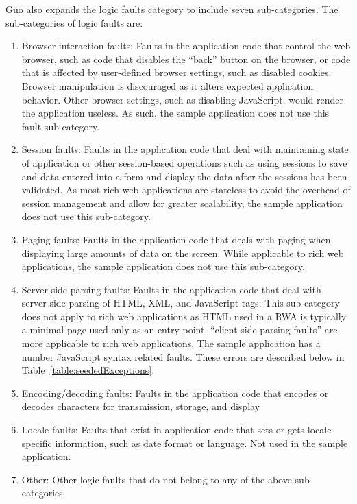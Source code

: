 Guo also expands the logic faults category to include seven sub-categories.  The sub-categories of logic faults are:

\begin{enumerate}
\item Browser interaction faults: Faults in the application code that control the web browser, such as code that disables the ``back'' button on the browser, or code that is affected by user-defined browser settings, such as disabled cookies.  Browser manipulation is discouraged as it alters expected application behavior.  Other browser settings, such as disabling JavaScript, would render the application useless.  As such, the sample application does not use this fault sub-category.

\item Session faults: Faults in the application code that deal with maintaining state of application or other session-based operations such as using sessions to save and data entered into a form and display the data after the sessions has been validated.  As most rich web applications are stateless to avoid the overhead of session management and allow for greater scalability, the sample application does not use this sub-category.

\item Paging faults: Faults in the application code that deals with paging when displaying large amounts of data on the screen.  While applicable to rich web applications, the sample application does not use this sub-category.

\item Server-side parsing faults: Faults in the application code that deal with server-side parsing of HTML, XML, and JavaScript tags.  This sub-category does not apply to rich web applications as HTML used in a RWA is typically a minimal page used only as an entry point.  ``client-side parsing faults''  are more applicable to rich web applications.   The sample application has a number JavaScript syntax related faults.  These errors are described below in Table~\ref{table:seededExceptions}.

\item Encoding/decoding faults: Faults in the application code that encodes or decodes characters for transmission, storage, and display

\item Locale faults: Faults that exist in application code that sets or gets locale-specific information, such as date format or language.  Not used in the sample application.

\item Other: Other logic faults that do not belong to any of the above sub categories.
\end{enumerate}

